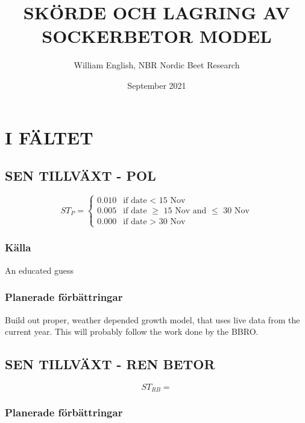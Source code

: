 \documentclass[fleqn]{article}
\title{SKÖRDE OCH LAGRING AV SOCKERBETOR MODEL}
\author{William English, NBR Nordic Beet Research}
\date{September 2021}
\begin{document}


\maketitle

\pagebreak


\section{I FÄLTET}
  
  \subsection{SEN TILLVÄXT - POL}

    \begin{equation}
      ST_P = 
      \begin{cases}
        0.010 & \text{if date < 15 Nov}\\
        0.005 & \text{if date $\geq$ 15 Nov and $\leq$ 30 Nov}\\
        0.000 & \text{if date > 30 Nov}
      \end{cases}
    \end{equation}

    \subsubsection{Källa}
    An educated guess

    \subsubsection{Planerade förbättringar}
    Build out proper, weather depended growth model, that uses live data from the current year. This will probably follow the work done by the BBRO.
  
  \subsection{SEN TILLVÄXT - REN BETOR}

    \begin{equation}
      ST_{RB} = 
    \end{equation}

    \subsubsection{Planerade förbättringar}
\end{document}
